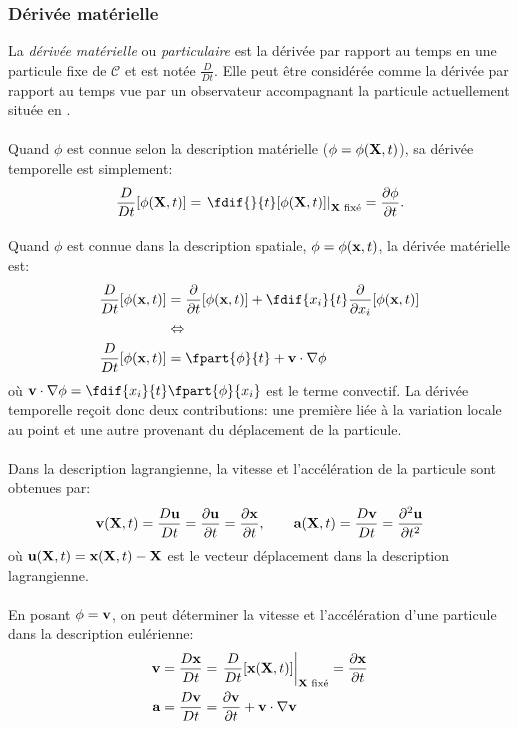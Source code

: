 \subsubsection*{Dérivée matérielle}
La \emph{dérivée matérielle} ou \emph{particulaire} est la dérivée par rapport au temps en une particule fixe de $\mathcal{C}$ et est notée $\frac{D}{Dt}$. Elle peut être considérée comme la dérivée par rapport au temps vue par un observateur accompagnant la particule actuellement située en .
\paragraph{}
 Quand $\phi$ est connue selon la description matérielle ($\phi=\phi(\textbf{X},t)$), sa dérivée temporelle est simplement: $$\frac{D}{Dt}[\phi(\fv{X},t)]=\left.\fdif{}{t}[\phi(\fv{X},t)]\right|_{\fv{X}\text{ fixé}}=\frac{\partial \phi}{\partial t}.$$

\paragraph{}
Quand $\phi$ est connue dans la description spatiale, $\phi=\phi(\textbf{x},t)$, la dérivée matérielle est:
$$\begin{aligned}
\frac{D}{Dt}[\phi(\fv{x},t)]&=\frac{\partial}{\partial t}[\phi(\fv{x},t)]+\fdif{x_i}{t}\frac{\partial}{\partial x_i}[\phi(\fv{x},t)]\\
 &\Leftrightarrow\\
 \frac{D}{Dt}[\phi(\fv{x},t)]&=\fpart{\phi}{t} + \fv{v}\cdot\nabla\phi
\end{aligned}$$
où $\fv{v}\cdot\nabla\phi=\fdif{x_i}{t}\fpart{\phi}{x_i}$ est le terme convectif. La dérivée temporelle reçoit donc deux contributions: une première liée à la variation locale au point  et une autre provenant du déplacement de la particule.
\paragraph{}
Dans la description lagrangienne, la vitesse et l'accélération de la particule sont obtenues par:
$$\textbf{v}(\textbf{X},t)=\frac{D\textbf{u}}{Dt}=\frac{\partial \textbf{u}}{\partial t}=\frac{\partial \textbf{x}}{\partial t},\qquad \textbf{a}(\textbf{X},t)=\frac{D\textbf{v}}{Dt}=\frac{\partial^2\textbf{u}}{\partial t^2}$$ où $\textbf{u}(\textbf{X},t)=\textbf{x}(\textbf{X},t)-\textbf{X}$ est le vecteur déplacement dans la description lagrangienne.
\paragraph{}
En posant $\phi=\textbf{v}$, on peut déterminer la vitesse et l'accélération d'une particule dans la description eulérienne:
$$\begin{aligned}
\textbf{v}&=\frac{D\textbf{x}}{Dt}=\left.\frac{D}{Dt}[\textbf{x}(\textbf{X},t)]\right|_{\textbf{X}\text{ fixé}}=\frac{\partial \textbf{x}}{\partial t}\\
\textbf{a}&=\frac{D\textbf{v}}{Dt}=\frac{\partial \textbf{v}}{\partial t}+\textbf{v}\cdot\nabla\textbf{v}
\end{aligned}$$
